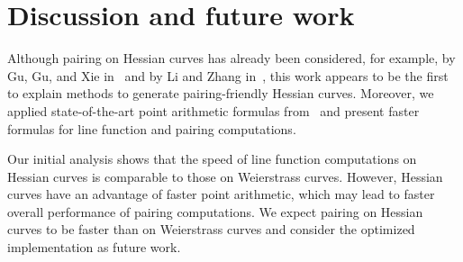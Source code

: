 \section{Discussion and future work}

Although pairing on Hessian curves has already been considered, for example, by Gu, Gu, and Xie in~\cite{2010/Gu} and by Li and Zhang in~\cite{2012/Li},
this work appears to be the first to explain methods to generate pairing-friendly Hessian curves.
Moreover, we applied state-of-the-art point arithmetic formulas from~\cite{2015/hessian}
and present faster formulas for line function and pairing computations.

Our initial analysis shows that the speed of line function computations on Hessian curves
is comparable to those on Weierstrass curves.
However, Hessian curves have an advantage of faster point arithmetic,
which may lead to faster overall performance of pairing computations.
We expect pairing on Hessian curves to be faster than on Weierstrass curves and
consider the optimized implementation as future work.

